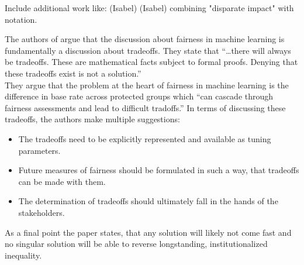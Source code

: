 Include additional work like: \cite{isabel01} (Isabel) \cite{isabel02} (Isabel) \cite{automatedDsicrimination} \cite{Singh} \cite{DBLP:conf/maics/RalescuR17} combining "disparate impact" with notation.

The authors of \cite{Berk.2018} argue that the discussion about fairness in machine learning 
is fundamentally a discussion about tradeoffs. They state that \enquote{\dots there will 
always be tradeoffs. These are mathematical facts subject to formal proofs. Denying that these
tradeoffs exist is not a solution.} \\
They argue that the problem at the heart of fairness in machine learning is the difference
in base rate across protected groups which \enquote{can cascade through fairness assessments
and lead to difficult tradoffs.} In terms of discussing these tradeoffs, the authors make multiple
suggestions:
\begin{itemize}
    \item The tradeoffs need to be explicitly represented and available as tuning parameters.
    \item Future measures of fairness should be formulated in such a way, that tradeoffs can
    be made with them.
    \item The determination of tradeoffs should ultimately fall in the hands of the stakeholders.
\end{itemize}
As a final point the paper states, that any solution will likely not come fast and no singular
solution will be able to reverse longstanding, institutionalized inequality.